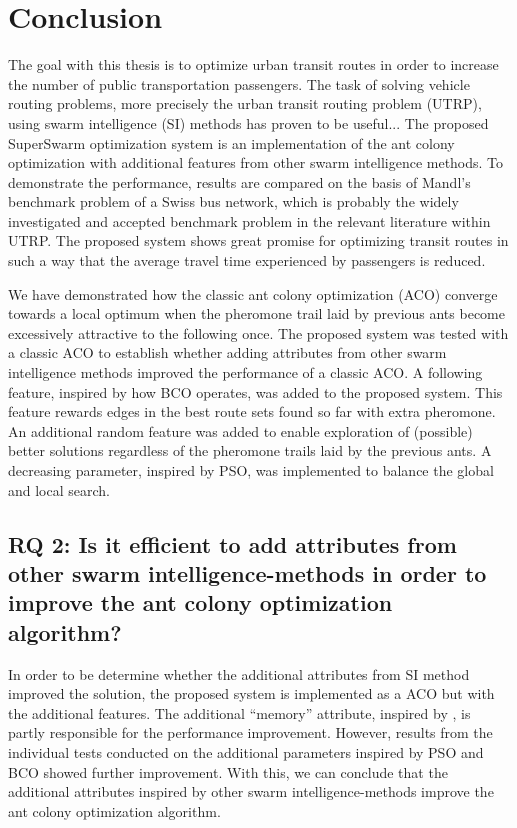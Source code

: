 \section{Conclusion}

The goal with this thesis is to optimize urban transit routes in order to increase the number of public transportation passengers. The task of solving vehicle routing problems, more precisely the urban transit routing problem (UTRP), using swarm intelligence (SI) methods has proven to be useful... The proposed SuperSwarm optimization system is an implementation of the ant colony optimization with additional features from other swarm intelligence methods. To demonstrate the performance, results are compared on the basis of Mandl's benchmark problem of a Swiss bus network, which is probably the widely investigated and accepted benchmark problem in the relevant literature within UTRP. The proposed system shows great promise for optimizing transit routes in such a way that the average travel time experienced by passengers is reduced. 
\newline

We have demonstrated how the classic ant colony optimization (ACO) converge towards a local optimum when the pheromone trail laid by previous ants become excessively attractive to the following once. The proposed system was tested with a classic ACO to establish whether adding attributes from other swarm intelligence methods improved the performance of a classic ACO. A following feature, inspired by how BCO operates, was added to the proposed system. This feature rewards edges in the best route sets found so far with extra pheromone. An additional random feature was added to enable exploration of (possible) better solutions regardless of the pheromone trails laid by the previous ants. A decreasing parameter, inspired by PSO, was implemented to balance the global and local search. 

\subsection*{RQ 2: Is it efficient to add attributes from other swarm intelligence-methods in order to improve the ant colony optimization algorithm?}

In order to be determine whether the additional attributes from SI method improved the solution, the proposed system is implemented as a ACO but with the additional features. The additional ``memory'' attribute, inspired by \citet{dorigo96, sedighpour14, poorzahedy11, salehinejad10}, is partly responsible for the performance improvement. However, results from the individual tests conducted on the additional parameters inspired by PSO and BCO showed further improvement. With this, we can conclude that the additional attributes inspired by other swarm intelligence-methods improve the ant colony optimization algorithm. 

